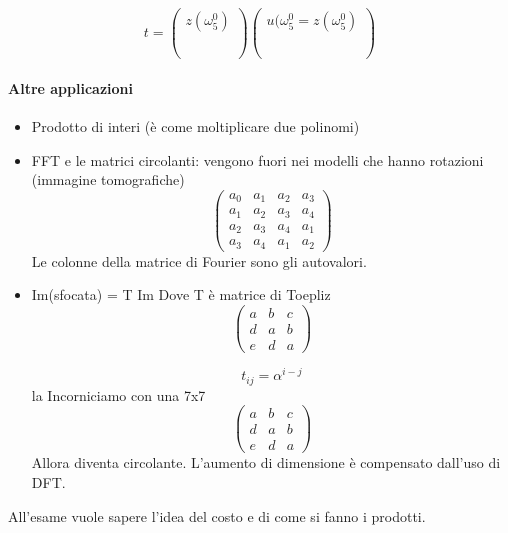 $$
t = \begin{pmatrix}
  z(\omega_5^0) \\
   \\
  \\
  \\
\end{pmatrix}
\begin{pmatrix}
u(\omega_5^{0} =
  z(\omega_5^0) \\
   \\
  \\
  \\
\end{pmatrix}
$$
\paragraph{Altre applicazioni}
\begin{itemize}
\item Prodotto di interi (\`e come moltiplicare due polinomi)
\item FFT e le matrici circolanti: vengono fuori nei modelli che
     hanno rotazioni (immagine tomografiche)
$$
\begin{pmatrix}
   a_0  & a_1 &  a_2 & a_3 \\
   a_1 & a_2 & a_3 & a_4 \\
   a_2 & a_3 & a_4 & a_1 \\
   a_3 & a_4 & a_1  & a_2 
\end{pmatrix}
$$
Le colonne della matrice di Fourier sono gli autovalori.



\item Im(sfocata) = T Im
Dove T \`e matrice di Toepliz
$$
\begin{pmatrix}
  a & b & c \\
  d & a & b \\
  e & d & a
\end{pmatrix}
$$

$$ t_{ij} = \alpha^{i-j} $$
la Incorniciamo con una 7x7
$$
\begin{pmatrix}
  a & b & c \\
  d & a & b \\
  e & d & a
\end{pmatrix}
$$
Allora diventa circolante.
L'aumento di dimensione \`e compensato dall'uso di DFT.

\end{itemize}
\begin{notes}
All'esame vuole sapere l'idea del costo e di come si fanno i
prodotti.  
\end{notes}


\outbpdocument
